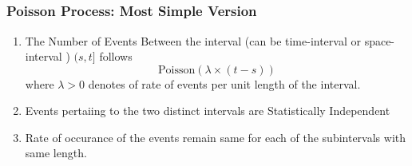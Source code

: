 \documentclass[compress]{beamer}
\begin{document}
\begin{frame}\frametitle{ }
\vspace{-.1in}
\\
\vspace{.1in}
\\
\vspace{.1in}
\\
\vspace{.1in}
\\
\vspace{.2in}
\end{frame}


\begin{frame}\frametitle{Poisson Process: Most Simple Version
}

\begin{enumerate}
\item The Number of Events Between the interval (can be time-interval or space-interval )  $(s, t]$ follows $$ \text{Poisson}(\lambda\times (t-s))$$
where $\lambda>0$ denotes of rate of events per unit length of the interval. 
\item Events pertaiing to the two distinct intervals are Statistically Independent
\item Rate of occurance of the events remain same for each of the subintervals with same length. 
\end{enumerate}

\end{frame}
\end{document}
